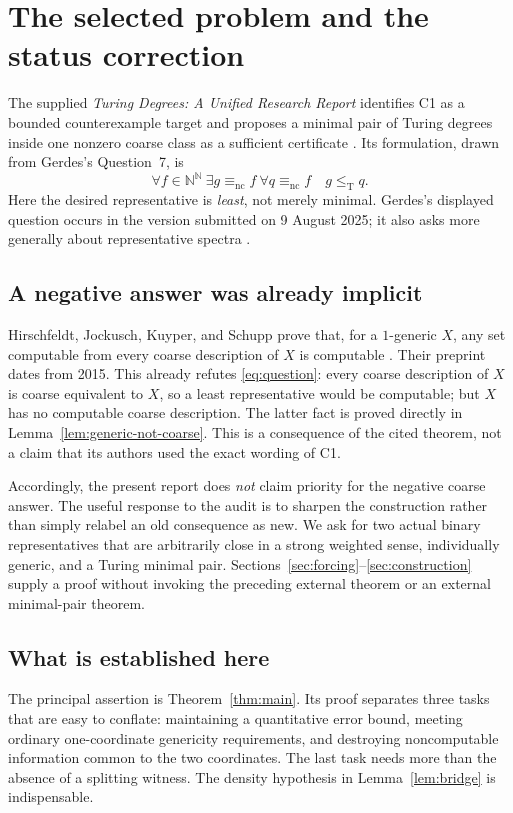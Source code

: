 \documentclass[11pt,a4paper]{article}
\newcommand{\N}{\mathbb N}
\newcommand{\Baire}{\N^{\N}}
\newcommand{\leT}{\leq_{\mathrm T}}
\newcommand{\nc}{\mathrm{nc}}
\theoremstyle{definition}
\theoremstyle{remark}
\begin{document}
\section{The selected problem and the status correction}\label{sec:status}
The supplied \emph{Turing Degrees: A Unified Research Report} identifies C1 as a bounded counterexample target and proposes a minimal pair of Turing degrees inside one nonzero coarse class as a sufficient certificate \cite{Survey}. Its formulation, drawn from Gerdes's Question~7, is
\begin{equation}\label{eq:question}
\forall f\in\Baire\ \exists g\equiv_{\nc}f\
\forall q\equiv_{\nc}f\quad g\leT q.
\end{equation}
Here the desired representative is \emph{least}, not merely minimal. Gerdes's displayed question occurs in the version submitted on 9 August 2025; it also asks more generally about representative spectra \cite[Question~7]{Gerdes}.

\subsection{A negative answer was already implicit}
Hirschfeldt, Jockusch, Kuyper, and Schupp prove that, for a $1$-generic $X$, any set computable from every coarse description of $X$ is computable \cite[Theorem~4.2]{HJKS}. Their preprint dates from 2015. This already refutes \eqref{eq:question}: every coarse description of $X$ is coarse equivalent to $X$, so a least representative would be computable; but $X$ has no computable coarse description. The latter fact is proved directly in Lemma~\ref{lem:generic-not-coarse}. This is a consequence of the cited theorem, not a claim that its authors used the exact wording of C1.

Accordingly, the present report does \emph{not} claim priority for the negative coarse answer. The useful response to the audit is to sharpen the construction rather than simply relabel an old consequence as new. We ask for two actual binary representatives that are arbitrarily close in a strong weighted sense, individually generic, and a Turing minimal pair. Sections~\ref{sec:forcing}--\ref{sec:construction} supply a proof without invoking the preceding external theorem or an external minimal-pair theorem.

\subsection{What is established here}
The principal assertion is Theorem~\ref{thm:main}. Its proof separates three tasks that are easy to conflate: maintaining a quantitative error bound, meeting ordinary one-coordinate genericity requirements, and destroying noncomputable information common to the two coordinates. The last task needs more than the absence of a splitting witness. The density hypothesis in Lemma~\ref{lem:bridge} is indispensable.
\end{document}
